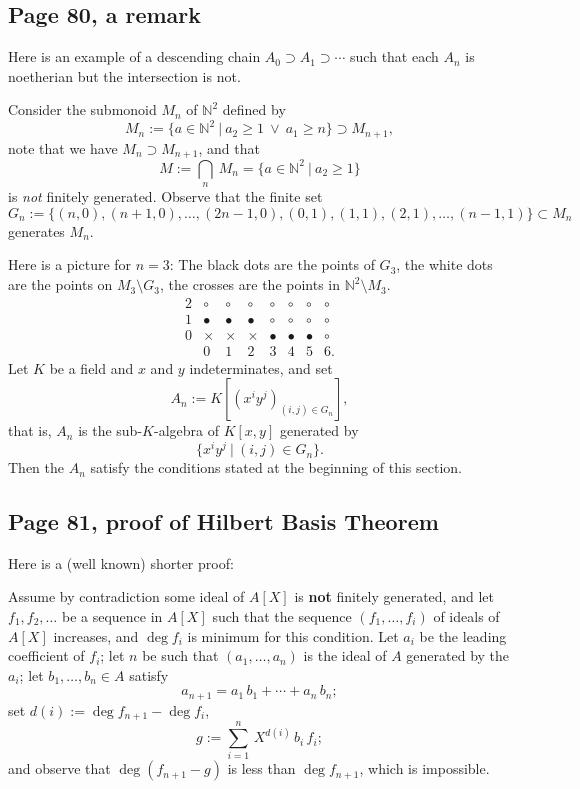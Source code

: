 \documentclass[parskip=half,fontsize=12pt]{scrartcl}%
\begin{document}
\subsection{Page 80, a remark}%

Here is an example of a descending chain $A_0\supset A_1\supset\cdots$ such that each $A_n$ is noetherian but the intersection is not.

Consider the submonoid $M_n$ of $\mathbb N^2$ defined by 
$$
M_n:=\{a\in\mathbb N^2\ |\ a_2\ge1\ \lor\ a_1\ge n\}\supset M_{n+1},
$$ 
note that we have $M_n\supset M_{n+1}$, and that 
$$
M:=\bigcap_n\ M_n=\{a\in\mathbb N^2\ |\ a_2\ge1\}
$$ 
is \emph{not} finitely generated. Observe that the finite set 
$$
G_n:=\{(n,0),(n+1,0),\dots,(2n-1,0),(0,1),(1,1),(2,1),\dots,(n-1,1)\}\subset M_n
$$ 
generates $M_n$. 

Here is a picture for $n=3$: The black dots are the points of $G_3$, the white dots are the points on $M_3\setminus G_3$, the crosses are the points in $\mathbb N^2\setminus M_3$.
$$
\begin{matrix}
2&\circ&\circ&\circ&\circ&\circ&\circ&\circ\\ 
1&\bullet&\bullet&\bullet&\circ&\circ&\circ&\circ\\ 
0&\times&\times&\times&\bullet&\bullet&\bullet&\circ\\ 
&0&1&2&3&4&5&6.
\end{matrix}
$$
Let $K$ be a field and $x$ and $y$ indeterminates, and set  
$$
A_n:=K\left[(x^iy^j)_{(i,j)\in G_n}\right],
$$ 
that is, $A_n$ is the sub-$K$-algebra of $K[x,y]$ generated by 
$$
\{x^iy^j\ |\ (i,j)\in G_n\}.
$$ 
Then the $A_n$ satisfy the conditions stated at the beginning of this section.

\subsection{Page 81, proof of Hilbert Basis Theorem}%

Here is a (well known) shorter proof:

Assume by contradiction some ideal %
of $A[X]$ is \textbf{not} finitely generated, and let $f_1,f_2,\dots$ be a sequence in $A[X]$ such that the sequence $(f_1,\dots,f_i)$ of ideals of $A[X]$ increases, and $\deg f_i$ is minimum for this condition. Let $a_i$ be the leading coefficient of $f_i$; let $n$ be such that $(a_1,\dots,a_n)$ is the ideal of $A$ generated by the $a_i$; let $b_1,\dots,b_n\in A$ satisfy 
$$
a_{n+1}=a_1\,b_1+\cdots+a_n\,b_n;
$$ 
set $d(i):=\deg f_{n+1}-\deg f_i$, 
$$
g:=\sum_{i=1}^n\,X^{d(i)}\,b_i\,f_i;
$$ 
and observe that $\deg(f_{n+1}-g)$ is less than $\deg f_{n+1}$, which is impossible.
\end{document}
